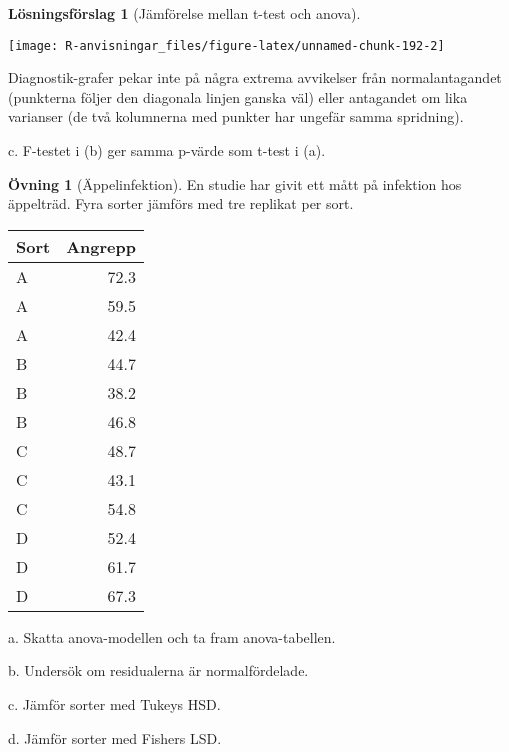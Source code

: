 \documentclass[
]{book}
\theoremstyle{definition}
\theoremstyle{definition}
\theoremstyle{definition}
\newtheorem{exercise}{Övning}[chapter]
\theoremstyle{definition}
\newtheorem{hypothesis}{Lösningsförslag}[chapter]
\theoremstyle{remark}
\begin{document}
\begin{hypothesis}[Jämförelse mellan t-test och anova]
\begin{center}\texttt{[image: R-anvisningar\_files/figure-latex/unnamed-chunk-192-2]} \end{center}

Diagnostik-grafer pekar inte på några extrema avvikelser från normalantagandet (punkterna följer den diagonala linjen ganska väl) eller antagandet om lika varianser (de två kolumnerna med punkter har ungefär samma spridning).

c. F-testet i (b) ger samma p-värde som t-test i (a).
\end{hypothesis}

\begin{exercise}[Äppelinfektion]
En studie har givit ett mått på infektion hos äppelträd. Fyra sorter jämförs med tre replikat per sort.

\begin{table}
\centering
\begin{tabular}[t]{lr}
\toprule
Sort & Angrepp\\
\midrule
A & 72.3\\
A & 59.5\\
A & 42.4\\
B & 44.7\\
B & 38.2\\
\addlinespace
B & 46.8\\
C & 48.7\\
C & 43.1\\
C & 54.8\\
D & 52.4\\
\addlinespace
D & 61.7\\
D & 67.3\\
\bottomrule
\end{tabular}
\end{table}

a. Skatta anova-modellen och ta fram anova-tabellen.

b. Undersök om residualerna är normalfördelade.

c. Jämför sorter med Tukeys HSD.

d. Jämför sorter med Fishers LSD.
\end{exercise}
\end{document}
